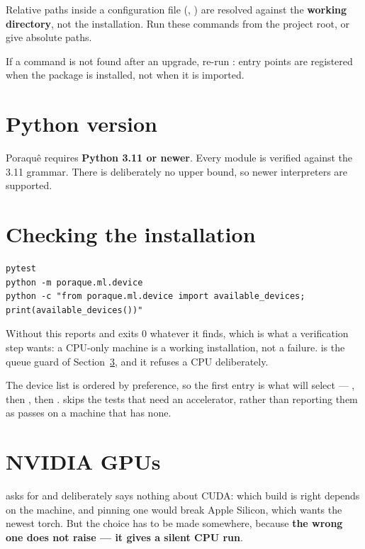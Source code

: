 \begin{pnote}
Relative paths inside a configuration file (, )
are resolved against the \textbf{working directory}, not the installation. Run
these commands from the project root, or give absolute paths.
\end{pnote}

If a command is not found after an upgrade, re-run :
entry points are registered when the package is installed, not when it is
imported.

\section{Python version}

\begin{pnote}
Poraqu\^e requires \textbf{Python 3.11 or newer}. Every module is verified
against the 3.11 grammar. There is deliberately no upper bound, so newer
interpreters are supported.
\end{pnote}

\section{Checking the installation}

\begin{lstlisting}
pytest
python -m poraque.ml.device
python -c "from poraque.ml.device import available_devices; print(available_devices())"
\end{lstlisting}

Without  this reports and exits 0 whatever it finds, which is what
a verification step wants: a CPU-only machine is a working installation, not a
failure.  is the queue guard of
Section~\ref{sec:cuda}, and it refuses a CPU deliberately.

The device list is ordered by preference, so the first entry is what
 will select --- , then , then .
 skips the tests that need an accelerator, rather than
reporting them as passes on a machine that has none.

\section{NVIDIA GPUs}
\label{sec:cuda}

 asks for  and deliberately says nothing
about CUDA: which build is right depends on the machine, and pinning one would
break Apple Silicon, which wants the newest torch. But the choice has to be
made somewhere, because \textbf{the wrong one does not raise --- it gives a
silent CPU run}.

